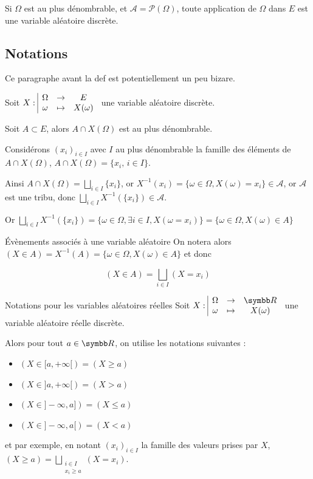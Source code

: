 \begin{remarque}
    Si $\Omega$ est au plus dénombrable, et $\mathcal A = \mathscr P(\Omega)$, toute application 
    de $\Omega$ dans $E$ est une variable aléatoire discrète.
\end{remarque}

\subsection{Notations}

Ce paragraphe avant la def est potentiellement un peu bizare.

Soit $X: \space \begin{array}{|ccc} \displaystyle \Omega & \to & \displaystyle E \\ \displaystyle \omega & \mapsto & \displaystyle X(\omega) \end{array}$ une variable aléatoire discrète.

Soit $A \subset E$, alors $A \cap X(\Omega)$ est au plus dénombrable. 

Considérons $(x_i)_{i \in I}$ avec $I$ au plus dénombrable la famille des éléments 
de $A \cap X(\Omega)$, $A \cap X(\Omega) = \{x_i, \, i \in I\}$.

Ainsi $A \cap X(\Omega) = \bigsqcup_{i \in I} \{x_i\}$, or 
$X^{-1}({x_i}) = \{\omega \in \Omega, X(\omega) = x_i\} \in \mathcal A$, or $\mathcal A$
est une tribu, donc $\displaystyle \bigsqcup_{i \in I} X^{-1}(\{x_i\}) \in \mathcal A$.

Or $\bigsqcup_{i \in I} X^{-1}(\{x_i\}) = \{\omega \in \Omega, \exists i \in I, X(\omega = x_i)\} = \{\omega \in \Omega, X(\omega) \in A\}$


\begin{definition}{Évènements associés à une variable aléatoire}{}
    On notera alors $(X \in A) = X^{-1}(A) = \{\omega \in \Omega, X(\omega) \in A\}$ et donc 

    $$\displaystyle (X \in A) = \bigsqcup_{i \in I} (X = x_i)$$
    
\end{definition}

\begin{definition}{Notations pour les variables aléatoires réelles}{}
    Soit $\fonction{X}{\Omega}{\R}{\omega}{X(\omega)}$ une variable aléatoire réelle discrète.

    Alors pour tout $a \in \R$, on utilise les notations suivantes : 

    \begin{itemize}
        \item $(X \in [a, + \infty[) = (X \geqslant a)$
        \item $(X \in ]a, + \infty[) = (X > a)$
        \item $(X \in ]-\infty, a]) = (X \leqslant a)$
        \item $(X \in ]-\infty, a[) = (X < a)$
    \end{itemize}

    et par exemple, en notant $(x_i)_{i \in I}$ la famille des valeurs prises par $X$, 
    $\displaystyle (X \geqslant a) = \bigsqcup_{\substack{i \in I \\ x_i \geqslant a}} (X = x_i)$.
\end{definition}

